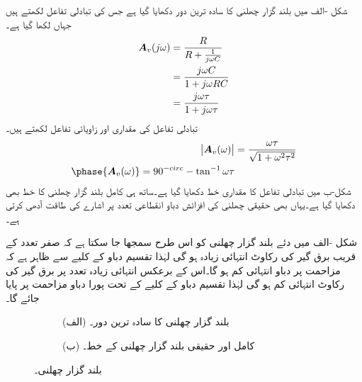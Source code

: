 شکل -الف میں بلند گزار چھلنی کا سادہ ترین دور دکھایا گیا ہے جس کی تبادلی تفاعل لکھتے ہیں جہاں  لکھا گیا ہے۔
\begin{align*}
{\ensuremath{{\boldsymbol{A}}}}_v(j\omega)&=\frac{R}{R+\frac{1}{j\omega C}}\\
&=\frac{j\omega C}{1+j\omega RC}\\
&=\frac{j\omega \tau}{1+j\omega \tau}
\end{align*}
تبادلی تفاعل کی مقداری اور زاویائی تفاعل لکھتے ہیں۔
\begin{align}
\abs{\bA_v(\omega)}&=\frac{\omega \tau}{\sqrt{1+\omega^2 \tau^2}}\\
\phase{\bA_v(\omega)}=90^{-circ}-\tan^{-1}\omega \tau
\end{align}
شکل-ب میں تبادلی تفاعل کا مقداری خط دکھایا گیا ہے۔ساتھ ہی کامل بلند گزار چھلنی کا خط بھی دکھایا گیا ہے۔یہاں بھی حقیقی چھلنی کی افزائش دباو انقطاعی تعدد پر اشارے کی طاقت آدھی کرتی ہے۔


شکل -الف میں دئے بلند گزار چھلنی کو اس طرح سمجھا جا سکتا ہے کہ صفر تعدد کے قریب برق گیر کی رکاوٹ انتہائی زیادہ ہو گی لہٰذا تقسیم دباو کے کلیے سے ظاہر ہے کہ مزاحمت پر  دباو انتہائی کم ہو گا۔اس کے برعکس انتہائی زیادہ  تعدد پر برق گیر کی رکاوٹ انتہائی کم ہو گی لہٰذا تقسیم دباو کے کلیے کے تحت پورا دباو مزاحمت پر پایا جائے گا۔

\begin{figure}
\centering
\begin{subfigure}{0.33\textwidth}
\centering
{}
\caption*{(الف) بلند گزار چھلنی کا سادہ ترین دور۔}
\end{subfigure}%
\begin{subfigure}{0.66\textwidth}
\centering
{}
\caption*{(ب) کامل اور حقیقی بلند گزار چھلنی کے خط۔}
\end{subfigure}
\caption{بلند گزار چھلنی۔}
\label{شکل_تعدد_کامل_بلند_گزار_خصلت}
\end{figure}


